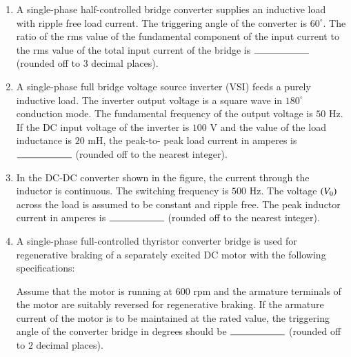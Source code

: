 \documentclass[journal,12pt,onecolumn]{IEEEtran}
\theoremstyle{remark}
\begin{document}
\begin{enumerate}[start=53]
	\item A single-phase half-controlled bridge converter supplies an inductive load with ripple free load current. The triggering angle of the converter is $60^\circ$. The ratio of the rms value of the fundamental component of the input current to the rms value of the total input current of the bridge is $\rule{2cm}{0.4pt}$ (rounded off to $3$ decimal places).

	\item A single-phase full bridge voltage source inverter (VSI) feeds a purely inductive load. The inverter output voltage is a square wave in $180^\circ$ conduction mode. The fundamental frequency of the output voltage is $50$ Hz. If the DC input voltage of the inverter is $100$ V and the value of the load inductance is $20$ mH, the peak-to- peak load current in amperes is $\rule{2cm}{0.4pt}$ (rounded off to the nearest integer).

	\item In the DC-DC converter shown in the figure, the current through the inductor is continuous. The switching frequency is $500$ Hz. The voltage $\left(V_0\right)$ across the load is assumed to be constant and ripple free. The peak inductor current in amperes is $\rule{2cm}{0.4pt}$ (rounded off to the nearest integer).
\begin{figure}[H]
    \centering
\end{figure}

	\item A single-phase full-controlled thyristor converter bridge is used for regenerative braking of a separately excited DC motor with the following specifications:
\begin{table}[H]    
  \centering
  
\end{table}
Assume that the motor is running at $600$ rpm and the armature terminals of the motor are suitably reversed for regenerative braking. If the armature current of the motor is to be maintained at the rated value, the triggering angle of the converter bridge in degrees should be $\rule{2cm}{0.4pt}$ (rounded off to $2$ decimal places).

\end{enumerate}
\end{document}
